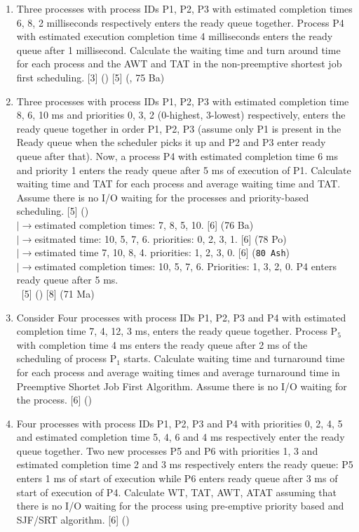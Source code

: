 \documentclass[12pt]{article}
\newcommand{\lb}{\\$\left|\rightarrow\right.$}
\newcommand{\enter}{\\\textcolor{white}{1}}
\begin{document}
\begin{enumerate}
      \item Three processes with process IDs P1, P2, P3 with estimated completion times 6, 8, 2 milliseconds respectively enters the ready queue together. Process P4 with estimated execution completion time 4 milliseconds enters the ready queue after 1 millisecond. Calculate the waiting time and turn around time for each process and the AWT and TAT in the non-preemptive shortest job first scheduling. \hfill [3] () [5] (, 75 Ba)

      \item Three processes with process IDs P1, P2, P3 with estimated completion time 8, 6, 10 ms and priorities 0, 3, 2 (0-highest, 3-lowest) respectively, enters the ready queue together in order P1, P2, P3 (assume only P1 is present in the Ready queue when the scheduler picks it up and P2 and P3 enter ready queue after that). Now, a process P4 with estimated completion time 6 ms and priority 1 enters the ready queue after 5 ms of execution of P1. Calculate waiting time and TAT for each process and average waiting time and TAT. Assume there is no I/O waiting for the processes and priority-based scheduling. \hfill [5] ()
        \lb estimated completion times: 7, 8, 5, 10. \hfill [6] (76 Ba)
        \lb esitmated time: 10, 5, 7, 6. priorities: 0, 2, 3, 1. \hfill [6] (78 Po)
        \lb estimated time 7, 10, 8, 4. priorities: 1, 2, 3, 0. \hfill [6] (\texttt{80 Ash})
        \lb estimated completion times: 10, 5, 7, 6. Priorities: 1, 3, 2, 0. P4 enters ready queue after 5 ms. 
          \enter\hfill [5] () [8] (71 Ma)

      \item Consider Four processes with process IDs P1, P2, P3 and P4 with estimated completion time 7, 4, 12, 3 ms, enters the ready queue together. Process P$_5$ with completion time 4 ms enters the ready queue after 2 ms of the scheduling of process P$_1$ starts. Calculate waiting time and turnaround time for each process and average waiting times and average turnaround time in Preemptive Shortet Job First Algorithm. Assume there is no I/O waiting for the process. \hfill [6] ()

      \item Four processes with process IDs P1, P2, P3 and P4 with priorities 0, 2, 4, 5 and estimated completion time 5, 4, 6 and 4 ms respectively enter the ready queue together. Two new processes P5 and P6 with priorities 1, 3 and estimated completion time 2 and 3 ms respectively enters the ready queue: P5 enters 1 ms of start of execution while P6 enters ready queue after 3 ms of start of execution of P4. Calculate WT, TAT, AWT, ATAT assuming that there is no I/O waiting for the process using pre-emptive priority based and SJF/SRT algorithm. \hfill [6] ()


\end{enumerate}
\end{document}
